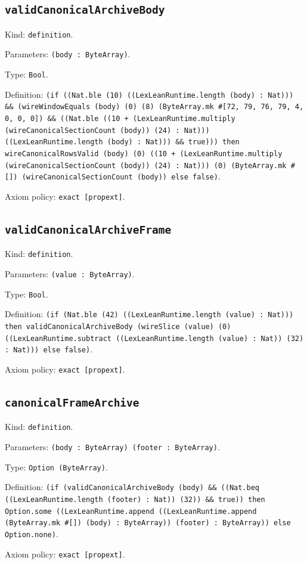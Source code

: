 \documentclass[11pt]{article}
\begin{document}
\subsection*{\texttt{validCanonicalArchiveBody}}
\noindent Kind: \texttt{definition}.\par
\noindent Parameters: \texttt{(body : ByteArray)}.\par
\noindent Type: \texttt{Bool}.\par
\noindent Definition: \texttt{(if ((Nat.ble (10) ((LexLeanRuntime.length (body) : Nat))) \&\& (wireWindowEquals (body) (0) (8) (ByteArray.mk \#[72, 79, 76, 79, 4, 0, 0, 0]) \&\& ((Nat.ble ((10 + (LexLeanRuntime.multiply (wireCanonicalSectionCount (body)) (24) : Nat))) ((LexLeanRuntime.length (body) : Nat))) \&\& true))) then wireCanonicalRowsValid (body) (0) ((10 + (LexLeanRuntime.multiply (wireCanonicalSectionCount (body)) (24) : Nat))) (0) (ByteArray.mk \#[]) (wireCanonicalSectionCount (body)) else false)}.\par
\noindent Axiom policy: \texttt{exact [propext]}.\par
\subsection*{\texttt{validCanonicalArchiveFrame}}
\noindent Kind: \texttt{definition}.\par
\noindent Parameters: \texttt{(value : ByteArray)}.\par
\noindent Type: \texttt{Bool}.\par
\noindent Definition: \texttt{(if (Nat.ble (42) ((LexLeanRuntime.length (value) : Nat))) then validCanonicalArchiveBody (wireSlice (value) (0) ((LexLeanRuntime.subtract ((LexLeanRuntime.length (value) : Nat)) (32) : Nat))) else false)}.\par
\noindent Axiom policy: \texttt{exact [propext]}.\par
\subsection*{\texttt{canonicalFrameArchive}}
\noindent Kind: \texttt{definition}.\par
\noindent Parameters: \texttt{(body : ByteArray) (footer : ByteArray)}.\par
\noindent Type: \texttt{Option (ByteArray)}.\par
\noindent Definition: \texttt{(if (validCanonicalArchiveBody (body) \&\& ((Nat.beq ((LexLeanRuntime.length (footer) : Nat)) (32)) \&\& true)) then Option.some ((LexLeanRuntime.append ((LexLeanRuntime.append (ByteArray.mk \#[]) (body) : ByteArray)) (footer) : ByteArray)) else Option.none)}.\par
\noindent Axiom policy: \texttt{exact [propext]}.\par
\end{document}
